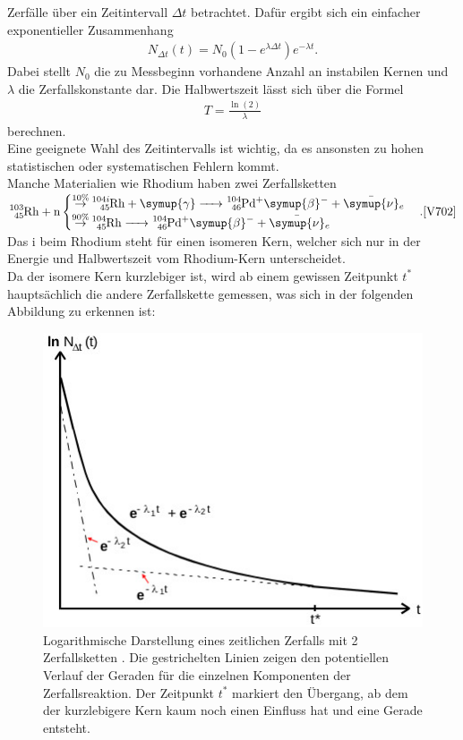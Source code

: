 Zerfälle über ein Zeitintervall $\Delta t$ betrachtet. Dafür ergibt sich ein
einfacher exponentieller Zusammenhang \cite{V702}
\begin{align}
    N_{\Delta t} (t) = N_0 (1-e^{\lambda \Delta t}) e^{- \lambda t}. \label{eq:5} 
\end{align}
Dabei stellt $N_0$ die zu Messbeginn vorhandene Anzahl an instabilen Kernen und $\lambda$ die Zerfallskonstante dar.
Die Halbwertszeit lässt sich über die Formel \cite{V702}
\begin{align}
    T=\frac{\ln(2)}{\lambda} \label{eq:6}
\end{align}
berechnen.\\
Eine geeignete Wahl des Zeitintervalls ist wichtig, da es ansonsten zu hohen
statistischen oder systematischen Fehlern kommt.\\
Manche Materialien wie Rhodium haben zwei Zerfallsketten\\
$\ce{^{103}_{45}Rh + n}  
\begin{cases}
    \ce{\stackrel{10\%}{\to} ^{104i}_{45}Rh +\symup{\gamma} -> ^{104}_{46}Pd+\symup{\beta}^- + \bar{\symup{\nu}}_e }\\
    \ce{\stackrel{90\%}{\to} ^{104}_{45}Rh ->  ^{104}_{46}Pd+\symup{\beta}^- + \bar{\symup{\nu}}_e }
\end{cases}.\text{\cite{V702}}
$
Das i beim Rhodium steht für einen isomeren Kern, welcher sich nur in der Energie und
Halbwertszeit vom Rhodium-Kern unterscheidet.\\
Da der isomere Kern kurzlebiger ist, wird ab einem gewissen Zeitpunkt $t^*$ hauptsächlich
die andere Zerfallskette gemessen, was sich in der folgenden Abbildung zu erkennen ist:
\begin{figure}[H]
    \centering
    \includegraphics[width=\linewidth]{images/Rh_theo.jpg}
    \caption{Logarithmische Darstellung eines zeitlichen Zerfalls mit
    2 Zerfallsketten \cite{V702}.
    Die gestrichelten Linien zeigen den potentiellen Verlauf der Geraden für die 
    einzelnen Komponenten der Zerfallsreaktion. Der Zeitpunkt $t^*$ markiert den Übergang, ab
    dem der kurzlebigere Kern kaum noch einen Einfluss hat und eine Gerade entsteht.
    }
    \label{fig:2}
\end{figure}


